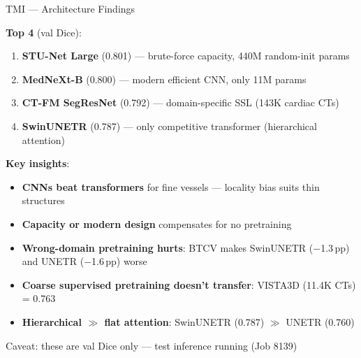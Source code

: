 \documentclass[aspectratio=169,10pt]{beamer}
\newcommand{\warn}[1]{\textcolor{orange!80!black}{#1}}
\newcommand{\pp}{\,pp}
\begin{document}
\begin{frame}{TMI --- Architecture Findings}

\textbf{Top 4} (val Dice):
\begin{enumerate}
    \item \textbf{STU-Net Large} (0.801) --- brute-force capacity, 440M random-init params
    \item \textbf{MedNeXt-B} (0.800) --- modern efficient CNN, only 11M params
    \item \textbf{CT-FM SegResNet} (0.792) --- domain-specific SSL (143K cardiac CTs)
    \item \textbf{SwinUNETR} (0.787) --- only competitive transformer (hierarchical attention)
\end{enumerate}

\vspace{0.2cm}
\textbf{Key insights}:
\begin{itemize}
    \item \textbf{CNNs beat transformers} for fine vessels --- locality bias suits thin structures
    \item \textbf{Capacity or modern design} compensates for no pretraining
    \item \textbf{Wrong-domain pretraining hurts}: BTCV makes SwinUNETR ($-$1.3\pp) and UNETR ($-$1.6\pp) worse
    \item \textbf{Coarse supervised pretraining doesn't transfer}: VISTA3D (11.4K CTs) = 0.763
    \item \textbf{Hierarchical $\gg$ flat attention}: SwinUNETR (0.787) $\gg$ UNETR (0.760)
\end{itemize}

\vspace{0.2cm}
\warn{Caveat: these are val Dice only --- test inference running (Job 8139)}

\end{frame}
\end{document}
